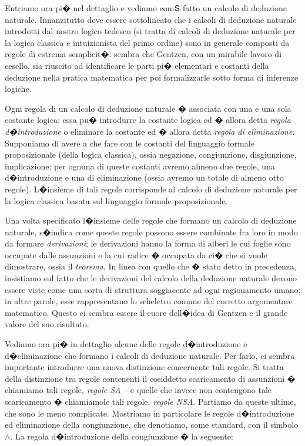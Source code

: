 \documentclass[a4paper,12pt]{aphex}
\begin{document}
Entriamo ora pi� nel dettaglio e vediamo comՏ fatto un calcolo di deduzione naturale.  Innanzitutto deve essere sottolineato che i calcoli di deduzione naturale introdotti dal nostro logico tedesco (si tratta di calcoli di deduzione naturale per la logica classica e intuizionista del primo ordine) sono in generale composti da regole di estrema semplicit�: sembra che Gentzen, con un mirabile lavoro di cesello, sia riuscito ad identificare le parti pi� elementari e costanti della deduzione  nella pratica matematica per poi formalizzarle sotto forma di inferenze logiche. 


Ogni regola di un calcolo di deduzione naturale � associata con una e una sola costante logica: essa pu� introdurre la costante logica ed � allora detta \emph{regola d�introduzione} o eliminare la costante ed � allora detta \emph{regola di eliminazione}. Supponiamo di avere a che fare con le costanti del linguaggio formale proposizionale (della logica classica), ossia negazione, congiunzione, disgiunzione, implicazione; per ognuna di queste costanti avremo almeno due regole, una d�introduzione e una di eliminazione (ossia avremo un totale di almeno otto regole).  L�insieme di tali regole corrisponde al calcolo di deduzione naturale per la logica classica basata sul linguaggio formale proposizionale.


Una volta specificato l�insieme delle regole che formano un calcolo di deduzione naturale, s�indica come queste regole possono essere combinate fra loro in modo da formare  \emph{derivazioni}; le derivazioni hanno la forma di alberi le cui foglie sono occupate dalle assunzioni e la cui radice � occupata da ci� che si vuole dimostrare, ossia il \emph{teorema}. In linea con quello che � stato detto in precedenza, insistiamo sul fatto che le derivazioni del calcolo della deduzione naturale devono essere viste come una sorta di struttura soggiacente ad ogni ragionamento umano; in altre parole, esse rappresentano lo scheletro comune del corretto argomentare matematico. Questo ci sembra essere il cuore dell�idea di Gentzen e il grande valore del suo risultato.

Vediamo ora pi� in dettaglio alcune delle regole d�introduzione e d�eliminazione che formano i calcoli di deduzione naturale. Per farlo, ci sembra importante introdurre una nuova distinzione concernente tali regole.  Si tratta della distinzione tra regole contenenti il cosiddetto scaricamento di assunzioni � chiamiamo tali regole, \emph{regole SA} -- e quelle che invece non contengono tale scaricamento � chiamiamole tali regole, \emph{regole NSA}. Partiamo da queste ultime, che sono le meno complicate. Mostriamo in particolare le regole d�introduzione ed eliminazione della congiunzione, che denotiamo, come standard, con il simbolo $\wedge$. La regola d�introduzione della congiunzione � la seguente: 
\end{document}

